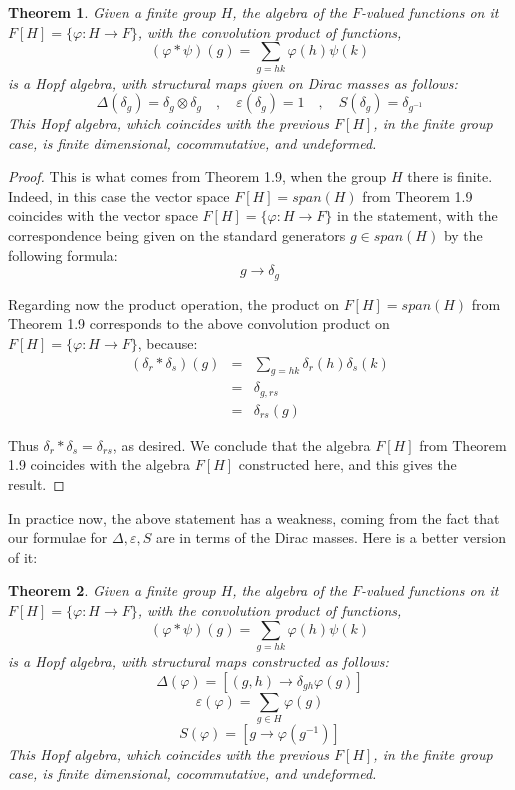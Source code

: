 \documentclass[12pt]{amsbook}
\newtheorem{theorem}{Theorem}[chapter]
\begin{document}
\begin{theorem}
Given a finite group $H$, the algebra of the $F$-valued functions on it $F[H]=\{\varphi:H\to F\}$, with the convolution product of functions,
$$(\varphi*\psi)(g)=\sum_{g=hk}\varphi(h)\psi(k)$$
is a Hopf algebra, with structural maps given on Dirac masses as follows:
$$\Delta(\delta_g)=\delta_g\otimes \delta_g\quad,\quad 
\varepsilon(\delta_g)=1\quad,\quad 
S(\delta_g)=\delta_{g^{-1}}$$
This Hopf algebra, which coincides with the previous $F[H]$, in the finite group case, is finite dimensional, cocommutative, and undeformed.
\end{theorem}

\begin{proof}
This is what comes from Theorem 1.9, when the group $H$ there is finite. Indeed, in this case the vector space $F[H]=span(H)$ from Theorem 1.9 coincides with the vector space $F[H]=\{\varphi:H\to F\}$ in the statement, with the correspondence being given on the standard generators $g\in span(H)$ by the following formula:
$$g\to\delta_g$$

Regarding now the product operation, the product on $F[H]=span(H)$ from Theorem 1.9 corresponds to the above convolution product on $F[H]=\{\varphi:H\to F\}$, because:
\begin{eqnarray*}
(\delta_r*\delta_s)(g)
&=&\sum_{g=hk}\delta_r(h)\delta_s(k)\\
&=&\delta_{g,rs}\\
&=&\delta_{rs}(g)
\end{eqnarray*}

Thus $\delta_r*\delta_s=\delta_{rs}$, as desired. We conclude that the algebra $F[H]$ from Theorem 1.9 coincides with the algebra $F[H]$ constructed here, and this gives the result.
\end{proof}

In practice now, the above statement has a weakness, coming from the fact that our formulae for $\Delta,\varepsilon,S$ are in terms of the Dirac masses. Here is a better version of it:

\begin{theorem}
Given a finite group $H$, the algebra of the $F$-valued functions on it $F[H]=\{\varphi:H\to F\}$, with the convolution product of functions,
$$(\varphi*\psi)(g)=\sum_{g=hk}\varphi(h)\psi(k)$$
is a Hopf algebra, with structural maps constructed as follows:
$$\Delta(\varphi)=[(g,h)\to\delta_{gh}\varphi(g)]$$
$$\varepsilon(\varphi)=\sum_{g\in H}\varphi(g)$$ 
$$S(\varphi)=[g\to\varphi(g^{-1})]$$
This Hopf algebra, which coincides with the previous $F[H]$, in the finite group case, is finite dimensional, cocommutative, and undeformed.
\end{theorem}
\end{document}
